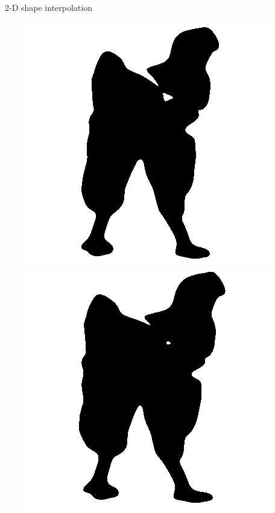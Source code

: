 \begin{frame}{2-D shape interpolation}
\begin{figure}
\begin{minipage}[t]{0.08\linewidth}
        \end{minipage}
        \hfill
        \begin{minipage}[t]{0.08\linewidth}
            \vspace{0pt}
            \centering
            \includegraphics[width=\textwidth]{png/kun-chicken/shape-1-5.png}
        \end{minipage}
        \hfill
        \begin{minipage}[t]{0.08\linewidth}
            \vspace{0pt}
            \centering
            \includegraphics[width=\textwidth]{png/kun-chicken/shape-1-6.png}

\end{minipage}
\end{figure}
\end{frame}
